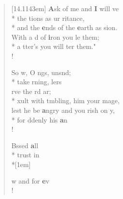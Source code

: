 \begin{flushleft}
\begin{verse}[14.1143em]
 \textbf{A}sk of me and \textbf{I} will ve \flagflex{\dag}\\*
the tions as ur ritance,\\*
and the \textbf{e}nds of the \textbf{e}arth as  sion.\\
 With a d of \textbf{i}ron you  le them;\\*
 a tter’s  you will ter them."\\!

 So w, O ngs, unsnd;\\*
take rning, lers   \\
 rve the rd  ar;\\*
xult with tmbling,  him your mage,\\
 lest he be \textbf{a}ngry and you rish on  y,\\*
for ddenly his \textbf{a}n  \\!

Bssed  \textbf{a}ll\\*
 trust in \\*[1em]

w and for \textbf{e}v \\!
\end{verse}
\end{flushleft}
